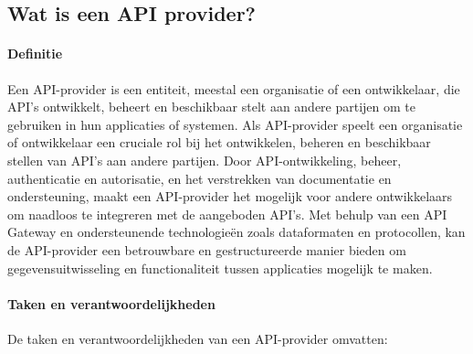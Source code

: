 \subsection{Wat is een API provider?}
\label{sec:Wat is een API provider?}
\paragraph{Definitie}
Een API-provider is een entiteit, meestal een organisatie of een ontwikkelaar, die API's ontwikkelt, beheert en beschikbaar stelt aan andere partijen om te gebruiken in hun applicaties of systemen. Als API-provider speelt een organisatie of ontwikkelaar een cruciale rol bij het ontwikkelen, beheren en beschikbaar stellen van API's aan andere partijen. Door API-ontwikkeling, beheer, authenticatie en autorisatie, en het verstrekken van documentatie en ondersteuning, maakt een API-provider het mogelijk voor andere ontwikkelaars om naadloos te integreren met de aangeboden API's. Met behulp van een API Gateway en ondersteunende technologieën zoals dataformaten en protocollen, kan de API-provider een betrouwbare en gestructureerde manier bieden om gegevensuitwisseling en functionaliteit tussen applicaties mogelijk te maken. \autocite{Cleo2023}

\paragraph{Taken en verantwoordelijkheden}
De taken en verantwoordelijkheden van een API-provider omvatten:


